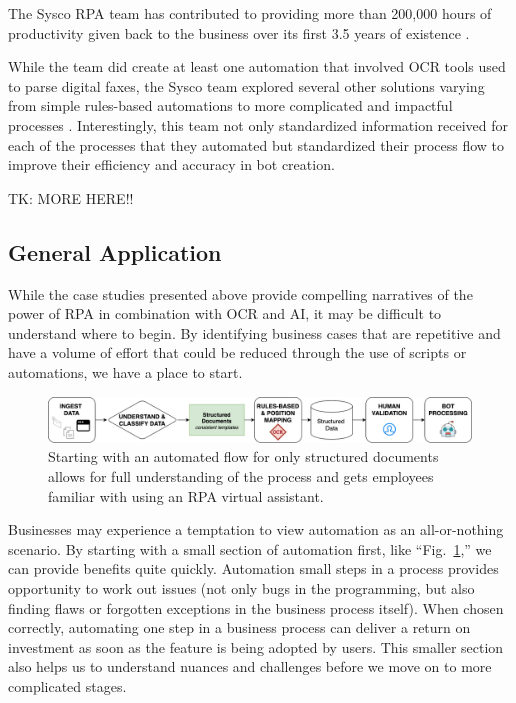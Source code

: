 \documentclass[conference]{IEEEtran}
\begin{document}
The Sysco RPA team has contributed to providing more than 200,000 hours of productivity given back to the business over its first 3.5 years of existence \cite{bpcafe2021sysco:slides}.

While the team did create at least one automation that involved OCR tools used to parse digital faxes, the Sysco team explored several other solutions varying from simple rules-based automations to more complicated and impactful processes \cite{bpcafe2021sysco}. Interestingly, this team not only standardized information received for each of the processes that they automated but standardized their process flow to improve their efficiency and accuracy in bot creation.

TK: MORE HERE!!

\subsection{General Application}
While the case studies presented above provide compelling narratives of the power of RPA in combination with OCR and AI, it may be difficult to understand where to begin. By identifying business cases that are repetitive and have a volume of effort that could be reduced through the use of scripts or automations, we have a place to start.

\begin{figure}[ht]
\centerline{\includegraphics[width=\columnwidth]{USE CASE - 1 - STRUCTURED.png}}
\caption{Starting with an automated flow for only structured documents allows for full understanding of the process and gets employees familiar with using an RPA virtual assistant.}
\label{figUseCase1}
\end{figure}

Businesses may experience a temptation to view automation as an all-or-nothing scenario. By starting with a small section of automation first, like ``Fig.~\ref{figUseCase1},'' we can provide benefits quite quickly. Automation small steps in a process provides opportunity to work out issues (not only bugs in the programming, but also finding flaws or forgotten exceptions in the business process itself). When chosen correctly, automating one step in a business process can deliver a return on investment as soon as the feature is being adopted by users. This smaller section also helps us to understand nuances and challenges before we move on to more complicated stages.
\end{document}
